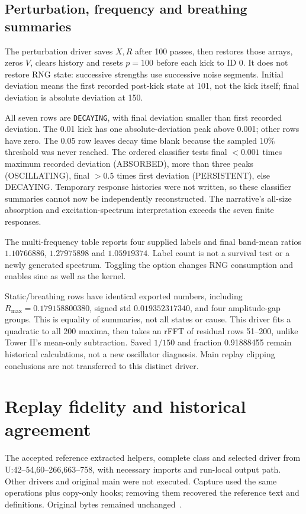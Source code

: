 \subsection{Perturbation, frequency and breathing summaries}
The perturbation driver saves \(X,R\) after 100 passes, then restores those arrays, zeros \(V\), clears history and resets \(p=100\) before each kick to ID 0. It does not restore RNG state: successive strengths use successive noise segments. Initial deviation means the first recorded post-kick state at 101, not the kick itself; final deviation is absolute deviation at 150.

All seven rows are \texttt{DECAYING}, with final deviation smaller than first recorded deviation. The 0.01 kick has one absolute-deviation peak above 0.001; other rows have zero. The 0.05 row leaves decay time blank because the sampled 10\% threshold was never reached. The ordered classifier tests final \(<0.001\) times maximum recorded deviation (ABSORBED), more than three peaks (OSCILLATING), final \(>0.5\) times first deviation (PERSISTENT), else DECAYING. Temporary response histories were not written, so these classifier summaries cannot now be independently reconstructed. The narrative's all-size absorption and excitation-spectrum interpretation exceeds the seven finite responses.

The multi-frequency table reports four supplied labels and final band-mean ratios \(1.10766886\), \(1.27975898\) and \(1.05919374\). Label count is not a survival test or a newly generated spectrum. Toggling the option changes RNG consumption and enables sine as well as the kernel.

Static/breathing rows have identical exported numbers, including \(R_{\max}=0.179158800380\), signed std \(0.019352317340\), and four amplitude-gap groups. This is equality of summaries, not all states or cause. This driver fits a quadratic to all 200 maxima, then takes an rFFT of residual rows 51--200, unlike Tower II's mean-only subtraction. Saved \(1/150\) and fraction 0.91888455 remain historical calculations, not a new oscillator diagnosis. Main replay clipping conclusions are not transferred to this distinct driver.

\section{Replay fidelity and historical agreement}\label{sec:fidelity}
The accepted reference extracted helpers, complete class and selected driver from U:42--54,60--266,663--758, with necessary imports and run-local output path. Other drivers and original main were not executed. Capture used the same operations plus copy-only hooks; removing them recovered the reference text and definitions. Original bytes remained unchanged~\citep{s7rprovenance,s7rreview}.

